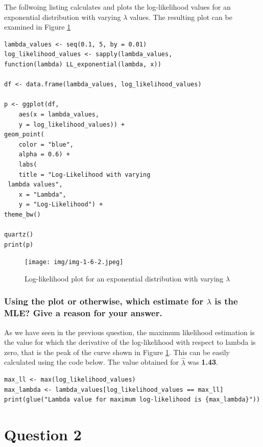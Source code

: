\documentclass[]{article}
\begin{document}
The follwoing listing calculates and plots the log-likelihood values for an exponential distribution with varying $\lambda$ values. The resulting plot can be examined in Figure \ref{fig:img-1-6-2}


\begin{lstlisting}
lambda_values <- seq(0.1, 5, by = 0.01)
log_likelihood_values <- sapply(lambda_values,
function(lambda) LL_exponential(lambda, x))

df <- data.frame(lambda_values, log_likelihood_values)

p <- ggplot(df, 
	aes(x = lambda_values, 
	y = log_likelihood_values)) +
geom_point(
	color = "blue",
	alpha = 0.6) +
	labs(
	title = "Log-Likelihood with varying
 lambda values",
	x = "Lambda",
	y = "Log-Likelihood") +
theme_bw()

quartz()
print(p)
\end{lstlisting}

\begin{figure}[H]
	\centering
	\texttt{[image: img/img-1-6-2.jpeg]}
	\caption{Log-likelihood plot for an exponential distribution with varying $\lambda$}
	\label{fig:img-1-6-2}
\end{figure}


\subsubsection{Using the plot or otherwise, which estimate for $\lambda$ is the MLE? Give a reason for your answer.}

As we have seen in the previous question, the maximum likelihood estimation is the value for which the derivative of the log-likelihood with respect to lambda is zero, that is the peak of the curve shown in Figure \ref*{fig:img-1-6-2}. This can be easily calculated using the code below. The value obtained for $\hat{\lambda}$ was \textbf{1.43}.

\begin{lstlisting}
max_ll <- max(log_likelihood_values)
max_lambda <- lambda_values[log_likelihood_values == max_ll]
print(glue("Lambda value for maximum log-likelihood is {max_lambda}"))
\end{lstlisting}


\section{Question 2}
\end{document}
